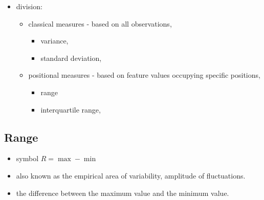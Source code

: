 \documentclass[
  english,
  letterpaper,
  DIV=11,
  numbers=noendperiod]{scrreprt}
\providecommand{\tightlist}{%
  \setlength{\itemsep}{0pt}\setlength{\parskip}{0pt}}
\begin{document}
\begin{itemize}
\tightlist
\item
  division:

  \begin{itemize}
  \tightlist
  \item
    classical measures - based on all observations,

    \begin{itemize}
    \tightlist
    \item
      variance,
    \item
      standard deviation,
    \end{itemize}
  \item
    positional measures - based on feature values occupying specific
    positions,

    \begin{itemize}
    \tightlist
    \item
      range
    \item
      interquartile range,
    \end{itemize}
  \end{itemize}
\end{itemize}

\subsection{Range}\label{range}

\begin{itemize}
\tightlist
\item
  symbol \(R=\max-\min\)
\item
  also known as the empirical area of variability, amplitude of
  fluctuations.
\item
  the difference between the maximum value and the minimum value.
\end{itemize}
\end{document}
